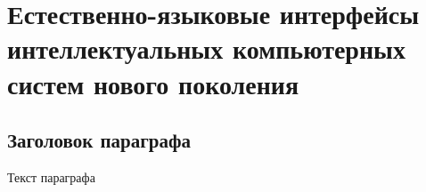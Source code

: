 \chapter{Естественно-языковые интерфейсы интеллектуальных компьютерных систем нового поколения}
\label{chapter_nl_interfaces}


\section{Заголовок параграфа}
Текст параграфа

%